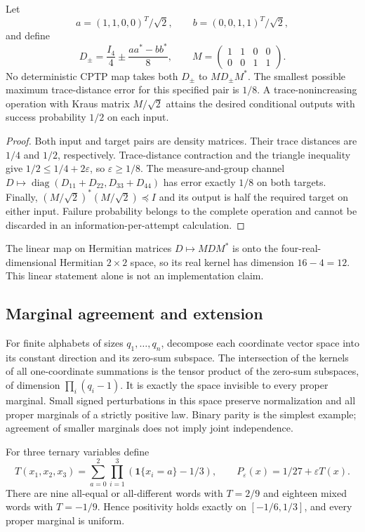 \begin{proposition}
Let
\[a=(1,1,0,0)^T/\sqrt2,\qquad b=(0,0,1,1)^T/\sqrt2,\]
and define
\[
 D_\pm=\frac{I_4}{4}\pm\frac{aa^*-bb^*}{8},\qquad
 M=\begin{pmatrix}1&1&0&0\\0&0&1&1\end{pmatrix}.
\]
No deterministic CPTP map takes both $D_\pm$ to $MD_\pm M^*$. The smallest possible maximum trace-distance error for this specified pair is $1/8$. A trace-nonincreasing operation with Kraus matrix $M/\sqrt2$ attains the desired conditional outputs with success probability $1/2$ on each input.
\end{proposition}
\begin{proof}
Both input and target pairs are density matrices. Their trace distances are $1/4$ and $1/2$, respectively. Trace-distance contraction and the triangle inequality give $1/2\le1/4+2\varepsilon$, so $\varepsilon\ge1/8$. The measure-and-group channel
$D\mapsto\operatorname{diag}(D_{11}+D_{22},D_{33}+D_{44})$ has error exactly $1/8$ on both targets. Finally, $(M/\sqrt2)^*(M/\sqrt2)\preceq I$ and its output is half the required target on either input. Failure probability belongs to the complete operation and cannot be discarded in an information-per-attempt calculation.
\end{proof}
The linear map on Hermitian matrices $D\mapsto MDM^*$ is onto the four-real-dimensional Hermitian $2\times2$ space, so its real kernel has dimension $16-4=12$. This linear statement alone is not an implementation claim.

\subsection{Marginal agreement and extension}
\label{str:marginals}
For finite alphabets of sizes $q_1,\ldots,q_n$, decompose each coordinate vector space into its constant direction and its zero-sum subspace. The intersection of the kernels of all one-coordinate summations is the tensor product of the zero-sum subspaces, of dimension $\prod_i(q_i-1)$. It is exactly the space invisible to every proper marginal. Small signed perturbations in this space preserve normalization and all proper marginals of a strictly positive law. Binary parity is the simplest example; agreement of smaller marginals does not imply joint independence.

For three ternary variables define
\[
 T(x_1,x_2,x_3)=\sum_{a=0}^2\prod_{i=1}^3(\mathbf1\{x_i=a\}-1/3),
 \qquad P_\varepsilon(x)=1/27+\varepsilon T(x).
\]
There are nine all-equal or all-different words with $T=2/9$ and eighteen mixed words with $T=-1/9$. Hence positivity holds exactly on $[-1/6,1/3]$, and every proper marginal is uniform.

